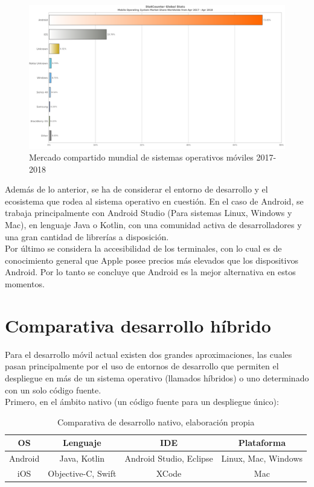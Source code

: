 \begin{figure}[H]
	\centering
	\includegraphics[scale=0.4]{figuras/comunicacion/Market_share.png}
	\caption{Mercado compartido mundial de sistemas operativos móviles 2017-2018 \cite{market_share_cita}}
	\label{market_share}
\end{figure}

Además de lo anterior, se ha de considerar el entorno de desarrollo y el ecosistema que rodea al sistema operativo en cuestión. En el caso de Android, se trabaja principalmente con Android Studio (Para sistemas Linux, Windows y Mac), en lenguaje Java o Kotlin, con una comunidad activa de desarrolladores y una gran cantidad de librerías a disposición.\\
Por último se considera la accesibilidad de los terminales, con lo cual es de conocimiento general que Apple posee precios más elevados que los dispositivos Android.
Por lo tanto se concluye que Android es la mejor alternativa en estos momentos.

\newpage
\section{Comparativa desarrollo híbrido}
Para el desarrollo móvil actual existen dos grandes aproximaciones, las cuales pasan principalmente por el uso de entornos de desarrollo que permiten el despliegue en más de un sistema operativo (llamados híbridos) o uno determinado con un solo código fuente.\\

Primero, en el ámbito nativo (un código fuente para un despliegue único): 

\begin{table}[H]
	\centering
	\begin{tabular}{| c | c | c | c |}
		\hline
		\multicolumn{1}{|c|}{\textbf{OS}}&
		\multicolumn{1}{c|}{\textbf{Lenguaje}}&
		\multicolumn{1}{|c|}{\textbf{IDE}}&
		\multicolumn{1}{|c|}{\textbf{Plataforma}}\\ \hline
		Android  & Java, Kotlin  & Android Studio, Eclipse & Linux, Mac, Windows \\ \hline
		iOS  & Objective-C, Swift & XCode & Mac \\ \hline
	\end{tabular}
	\caption{Comparativa de desarrollo nativo, elaboración propia}
	\label{native_comparative}
\end{table}

